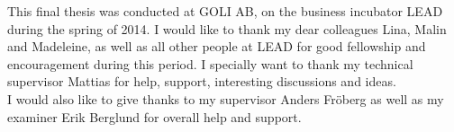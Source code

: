 This final thesis was conducted at GOLI AB, on the business incubator
LEAD during the spring of 2014. I would like to thank my dear colleagues
Lina, Malin and Madeleine, as well as all other people at LEAD for good
fellowship and encouragement during this period. I specially want to
thank my technical supervisor Mattias for help, support, interesting
discussions and ideas.\\

I would also like to give thanks to my supervisor Anders Fröberg as well
as my examiner Erik Berglund for overall help and support.\\
